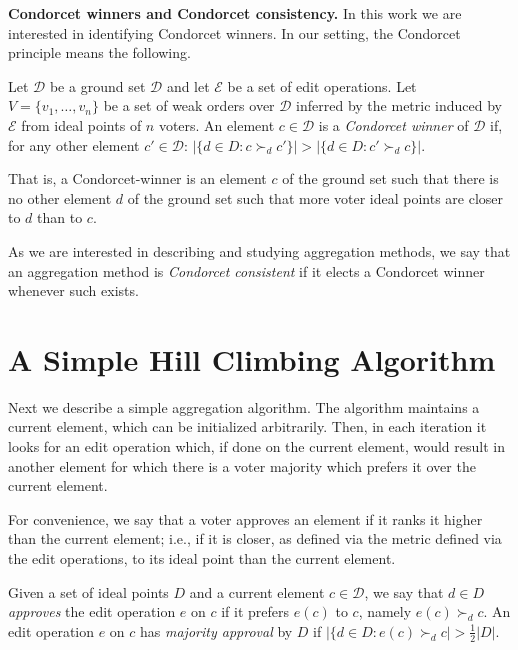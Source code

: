 \documentclass[sigconf]{aamas}  %
\newcommand{\mypara}[1]{\smallskip\noindent\textbf{#1.}}
\newcommand{\calD}{\mathcal{D}}
\newcommand{\calE}{\mathcal{E}}
\newcommand{\prefers}[1]{\succ_{#1}}
\begin{document}
\mypara{Condorcet winners and Condorcet consistency}
%
In this work we are interested in identifying Condorcet winners.
In our setting, the Condorcet principle means the following.

\begin{definition}
%
Let $\calD$ be a ground set $\calD$ and let $\calE$ be a set of edit operations.
Let $V = \{v_1, \ldots, v_n\}$ be a set of weak orders over $\calD$ inferred by the metric induced by $\calE$ from ideal points of $n$ voters.
An element $c \in \calD$ is a \emph{Condorcet winner} of $\calD$ if,
for any other element $c' \in \calD$:  $|\{ d \in D : c \prefers{d} c' \}| > |\{ d \in D : c' \prefers{d} c \}|$.
%
\end{definition}

That is,
a Condorcet-winner is an element $c$ of the ground set such that there is no other element $d$ of the ground set such that more voter ideal points are closer to $d$ than to $c$.

As we are interested in describing and studying aggregation methods,
we say that an aggregation method is \emph{Condorcet consistent} if it elects a Condorcet winner whenever such exists.


\section{A Simple Hill Climbing Algorithm}

Next we describe a simple aggregation algorithm. 
The algorithm maintains a current element, which can be initialized arbitrarily. Then, in each iteration it looks for an edit operation which, if done on the current element, would result in another element for which there is a voter majority which prefers it over the current element. 

For convenience, we say that a voter approves an element if it ranks it higher than the current element; i.e., if it is closer, as defined via the metric defined via the edit operations, to its ideal point than the current element.

\begin{definition}
%
Given a set of ideal points $D$ and a current element $c \in \calD$,  we say that $d \in D$ \emph{approves} the edit operation $e$ on $c$ if it prefers $e(c)$ to $c$, namely $e(c) \prefers{d} c$.  An edit operation $e$ on $c$ has \emph{majority approval} by $D$ if $|\{d \in D : e(c) \prefers{d} c| > \frac{1}{2}{|D|}$.
%
\end{definition}
\end{document}
